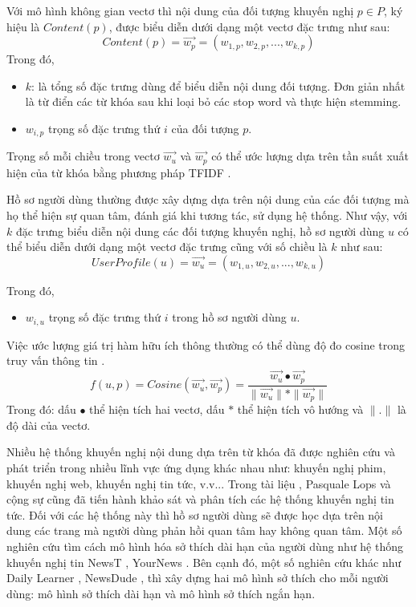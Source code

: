 Với mô hình không gian vectơ thì nội dung của đối tượng khuyến nghị $p \in P$, ký hiệu là $Content(p)$, được biểu diễn dưới dạng một vectơ đặc trưng như sau:
\begin{equation}
	Content(p) = \overrightarrow{w_{p}} = (w_{1,p}, w_{2,p}, ..., w_{k,p})
\end{equation}
Trong đó, 
\begin{itemize}
	\item $k$: là tổng số đặc trưng dùng để biểu diễn nội dung đối tượng. Đơn giản nhất là từ điển các từ khóa sau khi loại bỏ các stop word và thực hiện stemming.
	\item $w_{i,p}$ trọng số đặc trưng thứ $i$ của đối tượng $p$.
\end{itemize}

Trọng số mỗi chiều trong vectơ $\overrightarrow{w_{u}}$ và $\overrightarrow{w_{p}}$ có thể ước lượng dựa trên tần suất xuất hiện của từ khóa bằng phương pháp TFIDF \cite{Baeza-Yates:1999:MIR}.

Hồ sơ người dùng thường được xây dựng dựa trên nội dung của các đối tượng mà họ thể hiện sự quan tâm, đánh giá khi tương tác, sử dụng hệ thống. Như vậy, với $k$ đặc trưng biểu diễn nội dung các đối tượng khuyến nghị, hồ sơ người dùng $u$ có thể biểu diễn dưới dạng một vectơ đặc trưng cũng với số chiều là $k$ như sau:
\begin{equation}
UserProfile(u) = \overrightarrow{w_{u}} = (w_{1,u}, w_{2,u}, ..., w_{k,u})
\end{equation}

Trong đó, 
\begin{itemize}
	\item $w_{i,u}$ trọng số đặc trưng thứ $i$ trong hồ sơ người dùng $u$.
\end{itemize}

Việc ước lượng giá trị hàm hữu ích thông thường có thể dùng độ đo cosine trong truy vấn thông tin \cite{Baeza-Yates:1999:MIR}.
\begin{equation}
f(u,p) = Cosine(\overrightarrow{w_{u}},\overrightarrow{w_{p}}) = 
\frac{\overrightarrow{w_{u}} \bullet \overrightarrow{w_{p}}}{\parallel \overrightarrow{w_{u}} \parallel \ast \parallel \overrightarrow{w_{p}}\parallel}
\end{equation}
Trong đó: dấu $\bullet$ thể hiện tích hai vectơ, dấu $\ast$ thể hiện tích vô hướng và $\parallel.\parallel$ là độ dài của vectơ.

Nhiều hệ thống khuyến nghị nội dung dựa trên từ khóa đã được nghiên cứu và phát triển trong nhiều lĩnh vực ứng dụng khác nhau như: khuyến nghị phim, khuyến nghị web, khuyến nghị tin tức, v.v... Trong tài liệu \cite{Lops2011CBRecSys}, Pasquale Lops và cộng sự cũng đã tiến hành khảo sát và phân tích các hệ thống khuyến nghị tin tức. Đối với các hệ thống này thì hồ sơ người dùng sẽ được học dựa trên nội dung các trang mà người dùng phản hồi quan tâm hay không quan tâm. Một số nghiên cứu tìm cách mô hình hóa sở thích dài hạn của người dùng như hệ thống khuyến nghị tin NewsT \cite{366590}, YourNews \cite{Ahn:2007}. Bên cạnh đó, một số nghiên cứu khác như Daily Learner \cite{Billsus:2000:UMA:598285.598352}, NewsDude \cite{Billsus:1999:HUM:317328.317338}, thì xây dựng hai mô hình sở thích cho mỗi người dùng: mô hình sở thích dài hạn và mô hình sở thích ngắn hạn. 

